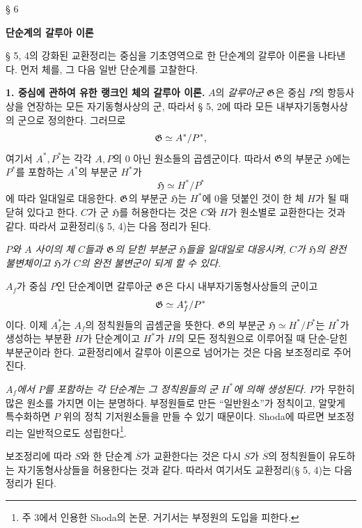 \begin{center}
§ 6

\textbf{단순계의 갈루아 이론}
\end{center}

§ 5, 4의 강화된 교환정리는 중심을 기초영역으로 한 단순계의 갈루아 이론을 나타낸다. 먼저 체를, 그 다음 일반 단순계를 고찰한다.

\noindent\textbf{1. 중심에 관하여 유한 랭크인 체의 갈루아 이론.} \(A\)의 \emph{갈루아군} \(\mathfrak G\)은 중심 \(P\)의 항등사상을 연장하는 모든 자기동형사상의 군, 따라서 § 5, 2에 따라 모든 내부자기동형사상의 군으로 정의한다. 그러므로
\[
\mathfrak G\simeq A^*/P^*,
\]
여기서 \(A^*,P^*\)는 각각 \(A,P\)의 0 아닌 원소들의 곱셈군이다. 따라서 \(\mathfrak G\)의 부분군 \(\mathfrak H\)에는 \(P^*\)를 포함하는 \(A^*\)의 부분군 \(H^*\)가
\[
\mathfrak H\simeq H^*/P^*
\]
에 따라 일대일로 대응한다. \(\mathfrak G\)의 부분군 \(\mathfrak H\)는 \(H^*\)에 0을 덧붙인 것이 한 체 \(H\)가 될 때 닫혀 있다고 한다. \(C\)가 군 \(\mathfrak H\)를 허용한다는 것은 \(C\)와 \(H\)가 원소별로 교환한다는 것과 같다. 따라서 교환정리(§ 5, 4)는 다음 정리가 된다.

\begin{center}
\textbf{}
\end{center}

\emph{\(P\)와 \(A\) 사이의 체 \(C\)들과 \(\mathfrak G\)의 닫힌 부분군 \(\mathfrak H\)들을 일대일로 대응시켜, \(C\)가 \(\mathfrak H\)의 완전 불변체이고 \(\mathfrak H\)가 \(C\)의 완전 불변군이 되게 할 수 있다.}

\noindent\textbf{}
\(A_f\)가 중심 \(P\)인 단순계이면 갈루아군 \(\mathfrak G\)은 다시 내부자기동형사상들의 군이고
\[
\mathfrak G\simeq A_f^*/P^*
\]
이다. 이제 \(A_f^*\)는 \(A_f\)의 정칙원들의 곱셈군을 뜻한다. \(\mathfrak G\)의 부분군 \(\mathfrak H\simeq H^*/P^*\)는 \(H^*\)가 생성하는 부분환 \(H\)가 단순계이고 \(H^*\)가 \(H\)의 모든 정칙원으로 이루어질 때 단순-닫힌 부분군이라 한다. 교환정리에서 갈루아 이론으로 넘어가는 것은 다음 보조정리로 주어진다.

\noindent\textbf{} \emph{\(A_f\)에서 \(P\)를 포함하는 각 단순계는 그 정칙원들의 군 \(H^*\)에 의해 생성된다.} \(P\)가 무한히 많은 원소를 가지면 이는 분명하다. 부정원들로 만든 “일반원소”가 정칙이고, 알맞게 특수화하면 \(P\) 위의 정칙 기저원소들을 만들 수 있기 때문이다. Shoda에 따르면 보조정리는 일반적으로도 성립한다\footnote{주 3에서 인용한 Shoda의 논문. 거기서는 부정원의 도입을 피한다.}.

보조정리에 따라 \(S\)와 한 단순계 \(\overline S\)가 교환한다는 것은 다시 \(S\)가 \(\overline S\)의 정칙원들이 유도하는 자기동형사상들을 허용한다는 것과 같다. 따라서 여기서도 교환정리(§ 5, 4)는 다음 정리가 된다.


